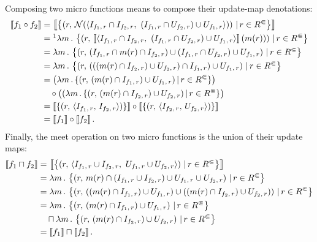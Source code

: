 Composing two micro functions means to compose their update-map denotations:
\begin{align}
    \denote{f_1\circ f_2}
    &=\denote{\left\{
              \left(
                r,\,
                  \mathcal N(\langle
                    \ione\cap\itwo,\ 
                    (\ione\cap\utwo)\cup\uone
                  \rangle)
              \right)\,|\,
              r\in\rcc
            \right\}}\notag\\
    &=\footnotemark\lambda m\,.\,\left\{
              \left(
                r,\,
                  \denote{\langle
                    \ione\cap\itwo,\ 
                    (\ione\cap\utwo)\cup\uone
                  \rangle}(m(r))
              \right)\,|\,
              r\in\rcc
            \right\}\notag\\
    &=\lambda m\,.\,\left\{\left(r,\,(\ione\cap m(r)\cap\itwo)\cup(\ione\cap\utwo)\cup\uone\right)\,|\,r\in\rcc\right\}\notag\\
    &=\lambda m\,.\,\left\{\left(r,\,(((m(r)\cap\itwo)\cup\utwo)\cap\ione)\cup\uone\right)\,|\,r\in\rcc\right\}\notag\\
    &=\left(\lambda m\,.\,\{(r,\,(m(r)\cap\ione)\cup\uone)\,|\,r\in\rcc\}\right)\notag\\
      &\quad\circ\left((\lambda m\,.\,\{(r,\,(m(r)\cap\itwo)\cup\utwo)\,|\,r\in\rcc\}\right)\notag\\
    &=\denote{\{(r,\,\setpair{\ione}{\itwo})\}}\circ\denote{\{(r,\,\setpair\itwo\utwo)\}}\notag\\
    &=\denote{f_1}\circ\denote{f_2}.\label{eq:compclosed}
\end{align}
\footnotetext{See Lemma~\ref{lem:normeq}.}
\indent Finally, the meet operation on two micro functions is the union of their update maps:
\begin{align}
    \denote{f_1\sqcap f_2}
    &=\denote{\left\{
              \left(
                r,\,
                  \langle
                    \ione\cup\itwo,\ 
                    \uone\cup\utwo
                  \rangle
              \right)\,|\,
              r\in\rcc
            \right\}}\notag\\
    &=\lambda m\,.\,\left\{\left(r,\,m(r)\cap(\ione\cup\itwo)\cup\uone\cup\utwo\right)\,|\,r\in\rcc\right\}\notag\\
    &=\lambda m\,.\,\left\{\left(r,\,((m(r)\cap\ione)\cup\uone)\cup((m(r)\cap\itwo)\cup\utwo)\right)\,|\,r\in\rcc\right\}\notag\\
    &=\lambda m\,.\,\left\{\left(r,\,(m(r)\cap\ione)\cup\uone\right)\,|\,r\in\rcc\right\}\notag\\
      &\quad\sqcap\lambda m\,.\,\left\{\left(r,\,(m(r)\cap\itwo)\cup\utwo\right)\,|\,r\in\rcc\right\}\notag\\
    &=\denote{f_1}\sqcap\denote{f_2}.\label{eq:meetclosed}
\end{align}

